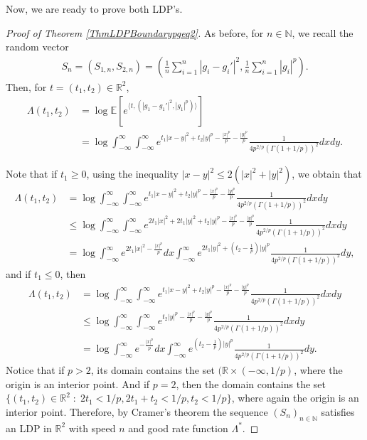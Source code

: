 \documentclass[10pt]{amsart}
\newcounter{theor}
\def\R{\mathbb{R}}
\def\N{\mathbb{N}}
\def\E{\mathbb{E}}
\numberwithin{equation}{section}
\begin{document}
Now, we are ready to prove both LDP's.
\begin{proof}[Proof of Theorem \ref{ThmLDPBoundarypgeq2}]
As before, for $n \in \N$, we recall the random vector 
\begin{align*}
S_n = \left( S_{1,n} , S_{2,n} \right) =
 \left( \frac{1}{n} \sum _{i=1}^n  \left| g_i - g_i' \right|^2 , 
 \frac{1}{n} \sum _{i=1}^n  \left| g_i  \right|^p \right).
\end{align*}
Then, for $t = (t_1,t_2) \in \R^2$,
\begin{align*}
\Lambda (t_1,t_2) & = \log \E \left[ e^{\langle t,( |g_1 - g_1'|^2 ,|g_1|^p ) \rangle} \right]
 \\
  & = \log \int _{-\infty} ^{\infty} \int _{-\infty} ^{\infty} e^{t_1 |x-y|^2 + t_2|y|^p    
  - \frac{|x|^p}{p} - \frac{|y|^p}{p} } \frac{1}{4p^{2/p} \left( \Gamma(1 + 1/p) \right)^2} dx dy .
\end{align*}

Note that if $t_1 \geq 0$, using the inequality $|x-y|^2 \leq 2(|x|^2 + |y|^2)$, we obtain that
\begin{align*}
\Lambda (t_1,t_2) & = \log \int _{-\infty} ^{\infty} \int _{-\infty} ^{\infty} e^{t_1 |x-y|^2 + t_2|y|^p    
  - \frac{|x|^p}{p} - \frac{|y|^p}{p} } \frac{1}{4p^{2/p} \left( \Gamma(1 + 1/p) \right)^2} dx dy
  \\
  & \leq \log \int _{-\infty} ^{\infty} \int _{-\infty} ^{\infty} e^{
  2t_1 |x|^2 + 2t_1|y|^2 + t_2|y|^p    
  - \frac{|x|^p}{p} - \frac{|y|^p}{p} } \frac{1}{4p^{2/p} \left( \Gamma(1 + 1/p) \right)^2} dx dy
  \\
  & = \log \int _{-\infty} ^{\infty}  e^{
  2t_1 |x|^2 - \frac{|x|^p}{p}    } dx
   \int _{-\infty} ^{\infty} e^{2t_1|y|^2 + \left(t_2 - \frac{1}{p} \right)|y|^p   } 
    \frac{1}{4p^{2/p} \left( \Gamma(1 + 1/p) \right)^2} dy,
\end{align*}
and if $t_1 \leq 0$, then
\begin{align*}
\Lambda (t_1,t_2) & = \log \int _{-\infty} ^{\infty} \int _{-\infty} ^{\infty} e^{t_1 |x-y|^2 + t_2|y|^p    
  - \frac{|x|^p}{p} - \frac{|y|^p}{p} } \frac{1}{4p^{2/p} \left( \Gamma(1 + 1/p) \right)^2} dx dy
  \\
  & \leq \log \int _{-\infty} ^{\infty} \int _{-\infty} ^{\infty} e^{
    t_2|y|^p    
  - \frac{|x|^p}{p} - \frac{|y|^p}{p} } \frac{1}{4p^{2/p} \left( \Gamma(1 + 1/p) \right)^2} dx dy
  \\
  & = \log \int _{-\infty} ^{\infty}  e^{
   - \frac{|x|^p}{p}    } dx
   \int _{-\infty} ^{\infty} e^{  \left(t_2 - \frac{1}{p} \right)|y|^p   } 
    \frac{1}{4p^{2/p} \left( \Gamma(1 + 1/p) \right)^2} dy.
\end{align*}
Notice that if $p > 2$, its domain contains the set $(\R \times (-\infty,1/p)$, where the origin is an interior point. And if $p = 2$, then the domain contains the set $\lbrace (t_1 , t_2) \in \mathbb{R}^2 \; : \; 2t_1 < 1/p , 2t_1 + t_2 < 1/p , t_2 < 1/p \rbrace$, where again the origin is an interior point. Therefore, by Cramer's theorem the sequence $(S_n)_{n\in\N}$ satisfies an LDP in $\R^2$ with speed $n$ and good rate function $\Lambda ^*$.


\end{proof}
\end{document}

